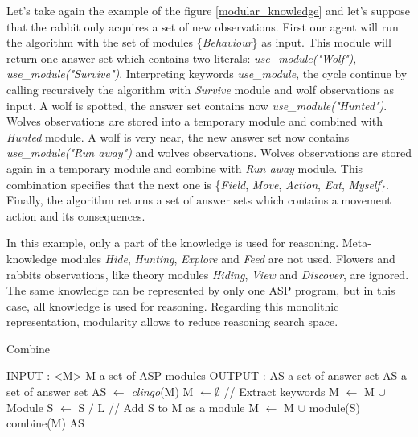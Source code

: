 \documentclass{aamas2012}
\begin{document}
	Let's take again the example of the figure \ref{modular_knowledge} and let's suppose that the rabbit only acquires a set of new observations.
	First our agent will run the algorithm with the set of modules \{\emph{Behaviour}\} as input.
	This module will return one answer set which contains two literals: \emph{use\_module("Wolf")}, \emph{use\_module("Survive")}.
	Interpreting keywords \emph{use\_module}, the cycle continue by calling recursively the algorithm with \emph{Survive} module and wolf observations as input.
	A wolf is spotted, the answer set contains now \emph{use\_module("Hunted")}.
	Wolves observations are stored into a temporary module and combined with \emph{Hunted} module.
	A wolf is very near, the new answer set now contains \emph{use\_module("Run away")} and wolves observations.
	Wolves observations are stored again in a temporary module and combine with \emph{Run away} module.
	This combination specifies that the next one is \{\emph{Field}, \emph{Move}, \emph{Action}, \emph{Eat}, \emph{Myself}\}.
	Finally, the algorithm returns a set of answer sets which contains a movement action and its consequences.
	
	In this example, only a part of the knowledge is used for reasoning.
	Meta-knowledge modules \emph{Hide}, \emph{Hunting}, \emph{Explore} and \emph{Feed} are not used.
	Flowers and rabbits observations, like theory modules \emph{Hiding}, \emph{View} and \emph{Discover}, are ignored.
	The same knowledge can be represented by only one ASP program, but in this case, all knowledge is used for reasoning.
	Regarding this monolithic representation, modularity allows to reduce reasoning search space.

	\begin{algorithm}
	\caption{Combine}
	\label{framework_algorithm}
	\begin{algorithmic}[1]
	\STATE INPUT : <M> M a set of ASP modules
	\STATE OUTPUT : AS a set of answer set
	\newline
	\STATE AS a set of answer set
	\newline
	\STATE AS $\leftarrow$ \emph{clingo}(M)
	\newline
		\STATE M $\leftarrow \emptyset$ 
		\newline
		\STATE // Extract keywords
				\STATE M $\leftarrow$ M $\cup$ Module
				\STATE S $\leftarrow$ S $/$ L
			\ENDIF
		\ENDFOR
		\newline
			\STATE // Add S to M as a module
			\STATE M $\leftarrow$ M $\cup$ module(S)
			\STATE combine(M)
		\ENDIF
	\ENDFOR
	\newline
	\RETURN AS
	\end{algorithmic}
	\end{algorithm}
\end{document}
